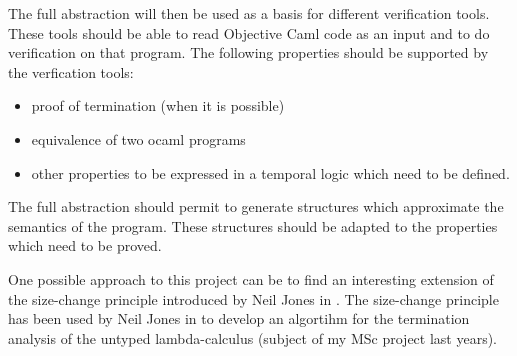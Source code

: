 \documentclass{article}
\begin{document}
The full abstraction will then be used as a basis for different verification tools.
These tools should be able to read Objective Caml code as an input and to do verification 
on that program. The following properties should be supported by the verfication tools:
\begin{itemize}
\item proof of termination (when it is possible)
\item equivalence of two ocaml programs
\item other properties to be expressed in a temporal logic which need to be defined. 
\end{itemize}


The full abstraction should permit to generate structures which approximate the semantics of the program.
These structures should be adapted to the properties which need to be proved.

One possible approach to this project can be to find an interesting extension of the size-change principle introduced by Neil Jones in \cite{jones01}. The size-change principle has been used by Neil Jones in \cite{jones04} to develop
an algortihm for the termination analysis of the untyped lambda-calculus (subject of my MSc project last years).

\pagebreak


 
\end{document}
